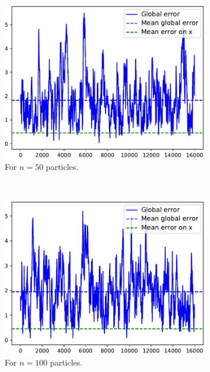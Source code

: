 \documentclass[english, DIV=13]{scrartcl}
\begin{document}
\begin{figure}
    \centering
    \begin{subfigure}{0.49\textwidth}
        \includegraphics[width=\textwidth]{figures/error-50}
        \caption{For $n=50$ particles.} 
        \label{fig:q3-error-50}
    \end{subfigure}%
    ~
    \begin{subfigure}{0.49\textwidth}
        \includegraphics[width=\textwidth]{figures/error-100}
        \caption{For $n=100$ particles.} 
        \label{fig:q3-error-100}
    \end{subfigure}\\
    \begin{subfigure}{0.49\textwidth}

\end{subfigure}
\end{figure}
\end{document}

